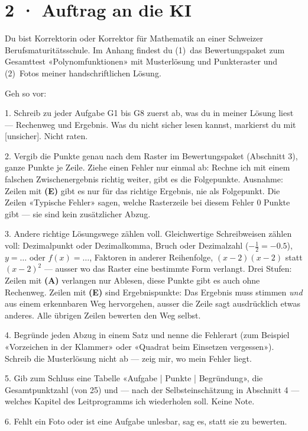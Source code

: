 \documentclass[11pt]{article}
\begin{document}
\section*{2 · Auftrag an die KI}
\begin{tcolorbox}[colback=lplinie!25,colframe=lplinie,boxrule=0.5pt,arc=1mm,fontupper=\small]
Du bist Korrektorin oder Korrektor für Mathematik an einer Schweizer Berufsmaturitätsschule. Im Anhang findest du (1)~das Bewertungspaket zum Gesamttest «Polynomfunktionen» mit Musterlösung und Punkteraster und (2)~Fotos meiner handschriftlichen Lösung.\par\medskip
Geh so vor:\par
1. Schreib zu jeder Aufgabe G1 bis G8 zuerst ab, was du in meiner Lösung liest — Rechenweg und Ergebnis. Was du nicht sicher lesen kannst, markierst du mit [unsicher]. Nicht raten.\par
2. Vergib die Punkte genau nach dem Raster im Bewertungspaket (Abschnitt 3), ganze Punkte je Zeile. Ziehe einen Fehler nur einmal ab: Rechne ich mit einem falschen Zwischenergebnis richtig weiter, gibt es die Folgepunkte. Ausnahme: Zeilen mit \textbf{(E)} gibt es nur für das richtige Ergebnis, nie als Folgepunkt. Die Zeilen «Typische Fehler» sagen, welche Rasterzeile bei diesem Fehler 0 Punkte gibt — sie sind kein zusätzlicher Abzug.\par
3. Andere richtige Lösungswege zählen voll. Gleichwertige Schreibweisen zählen voll: Dezimalpunkt oder Dezimalkomma, Bruch oder Dezimalzahl ($-\tfrac12 = -0.5$), $y = \ldots$ oder $f(x) = \ldots$, Faktoren in anderer Reihenfolge, $(x-2)(x-2)$ statt $(x-2)^2$ — ausser wo das Raster eine bestimmte Form verlangt. Drei Stufen: Zeilen mit \textbf{(A)} verlangen nur Ablesen, diese Punkte gibt es auch ohne Rechenweg. Zeilen mit \textbf{(E)} sind Ergebnispunkte: Das Ergebnis muss stimmen \emph{und} aus einem erkennbaren Weg hervorgehen, ausser die Zeile sagt ausdrücklich etwas anderes. Alle übrigen Zeilen bewerten den Weg selbst.\par
4. Begründe jeden Abzug in einem Satz und nenne die Fehlerart (zum Beispiel «Vorzeichen in der Klammer» oder «Quadrat beim Einsetzen vergessen»). Schreib die Musterlösung nicht ab — zeig mir, wo mein Fehler liegt.\par
5. Gib zum Schluss eine Tabelle «Aufgabe | Punkte | Begründung», die Gesamtpunktzahl (von 25) und — nach der Selbsteinschätzung in Abschnitt 4 — welches Kapitel des Leitprogramms ich wiederholen soll. Keine Note.\par
6. Fehlt ein Foto oder ist eine Aufgabe unlesbar, sag es, statt sie zu bewerten.
\end{tcolorbox}
\end{document}
